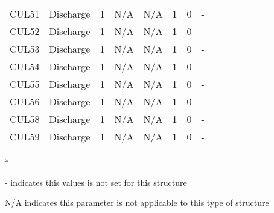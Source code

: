 \begin{table}[h]
\begin{tabular}{@{}lcccccccc@{}}
{CUL51}         & Discharge     & 1        & N/A         & N/A          & 1           & 0               & -            \\
{CUL52}         & Discharge     & 1        & N/A         & N/A          & 1           & 0               & -            \\
{CUL53}         & Discharge     & 1        & N/A         & N/A          & 1           & 0               & -            \\
{CUL54}         & Discharge     & 1        & N/A         & N/A          & 1           & 0               & -            \\
{CUL55}         & Discharge     & 1        & N/A         & N/A          & 1           & 0               & -            \\
{CUL56}         & Discharge     & 1        & N/A         & N/A          & 1           & 0               & -            \\
{CUL58}         & Discharge     & 1        & N/A         & N/A          & 1           & 0               & -            \\
{CUL59}         & Discharge     & 1        & N/A         & N/A          & 1           & 0               & -            \\
\hline
\end{tabular}

* \cite{corp2005}

- indicates this values is not set for this structure

N/A indicates this parameter is not applicable to this type of structure
\end{table}
\normalsize

